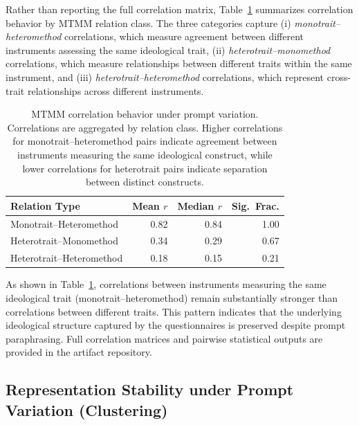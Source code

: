 \documentclass[11pt]{article}
\begin{document}
Rather than reporting the full correlation matrix, Table~\ref{tab:mtmm_summary}
summarizes correlation behavior by MTMM relation class. The three categories
capture (i) \textit{monotrait–heteromethod} correlations, which measure
agreement between different instruments assessing the same ideological trait,
(ii) \textit{heterotrait–monomethod} correlations, which measure relationships
between different traits within the same instrument, and
(iii) \textit{heterotrait–heteromethod} correlations, which represent
cross-trait relationships across different instruments.

\begin{table}[t]
\centering
\small
\setlength{\tabcolsep}{4pt}
\begin{tabularx}{\columnwidth}{>{\raggedright\arraybackslash}X r r r}
\toprule
\textbf{Relation Type} & \textbf{Mean $r$} & \textbf{Median $r$} & \textbf{Sig.\ Frac.} \\
\midrule
Monotrait--Heteromethod & 0.82 & 0.84 & 1.00 \\
Heterotrait--Monomethod & 0.34 & 0.29 & 0.67 \\
Heterotrait--Heteromethod & 0.18 & 0.15 & 0.21 \\
\bottomrule
\end{tabularx}
\caption{MTMM correlation behavior under prompt variation. Correlations are
aggregated by relation class. Higher correlations for monotrait--heteromethod
pairs indicate agreement between instruments measuring the same ideological
construct, while lower correlations for heterotrait pairs indicate separation
between distinct constructs.}
\label{tab:mtmm_summary}
\end{table}


As shown in Table~\ref{tab:mtmm_summary}, correlations between instruments
measuring the same ideological trait (monotrait–heteromethod) remain
substantially stronger than correlations between different traits. This pattern
indicates that the underlying ideological structure captured by the
questionnaires is preserved despite prompt paraphrasing. Full correlation
matrices and pairwise statistical outputs are provided in the artifact
repository.




\subsection{Representation Stability under Prompt Variation (Clustering)}
\label{app:phaseib-clustering}
\end{document}
